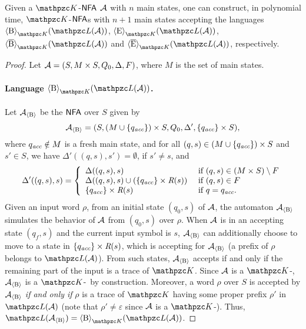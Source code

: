 \begin{proposition}\label{prop:closureUnderPrefixSuffix} Given a $\Ku$-$\text{\sffamily NFA}$ $\mathcal{A}$ with $n$ main states, 
one can construct, in polynomial time, $\Ku$-$\text{\sffamily NFA}$s with $n+1$ main states accepting the languages
$\hsB_{\Ku}(\Lang(\Au))$, $\hsE_{\Ku}(\Lang(\Au))$, $\hsBt_{\Ku}(\Lang(\Au))$ and $\hsEt_{\Ku}(\Lang(\Au))$, 
respectively.
\end{proposition}
\begin{proof}
Let $\mathcal{A}=(S, M\times S,Q_0,\Delta,F)$, where $M$ is the set of main states. 

\paragraph*{Language $\hsB_{\Ku}(\Lang(\Au))$.} Let $\mathcal{A}_{\operatorname{\langle B\rangle}}$ be the $\text{\sffamily NFA}$ over $S$ given by
\[\mathcal{A}_{\operatorname{\langle B\rangle}}=(S,(M\cup \{q_{\textit{acc}}\})\times S ,Q_0,\Delta',\{q_{\textit{acc}}\}\times S),\] where $q_{\textit{acc}}\notin M$ is a fresh main state, and for all $(q,s)\in (M\cup \{q_{\textit{acc}}\})\times S$ and $s'\in S$, we have $\Delta'((q,s),s')=\emptyset$, if $s'\neq s$, and 
%
\[
\Delta'((q,s),s) =  \left\{
    \begin{array}{ll}
    \Delta((q,s),s)
      &    \text{ if }   (q,s)\in (M\times S)\setminus F
      \\
    \Delta((q,s),s) \cup 
     (\{q_{\textit{acc}}\}\times \textit{R}(s))
      &    \text{ if }    (q,s)\in F
      \\
    \{q_{\textit{acc}}\}\times \textit{R}(s) &    \text{ if }    q = q_{\textit{acc}}.
    \end{array}
  \right.
\]
%
Given an input word $\rho$, from an initial state $(q_0,s)$ of $\mathcal{A}$,   the automaton $\mathcal{A}_{\operatorname{\langle B\rangle}}$ simulates the behavior of $\mathcal{A}$ from $(q_0,s)$ over $\rho$. When $\mathcal{A}$ is in an accepting state $(q_f,s)$ and the current  input symbol is $s$, $\mathcal{A}_{\operatorname{\langle B\rangle}}$ can additionally choose
to  move to a state in  $\{q_{\textit{acc}}\}\times \textit{R}(s)$, which is accepting for $\mathcal{A}_{\operatorname{\langle B\rangle}}$ (a prefix of $\rho$ belongs to  $\Lang(\Au)$). From such states, $\mathcal{A}_{\operatorname{\langle B\rangle}}$ accepts if and only if the remaining part of the input is a trace of $\Ku$.
Since $\mathcal{A}$ is a $\Ku$-\NFA, $\mathcal{A}_{\operatorname{\langle B\rangle}}$ is a $\Ku$-\NFA\  by construction. Moreover, a word $\rho$ over $S$ is accepted by $\mathcal{A}_{\operatorname{\langle B\rangle}}$  \emph{if and only if} $\rho$ is a trace of $\Ku$ having some proper prefix $\rho'$ in $\Lang(\Au)$ (note that $\rho'\neq \varepsilon$ since $\mathcal{A}$ is a $\Ku$-\NFA). Thus, $\Lang(\Au_{\hsB})=\hsB_{\Ku}(\Lang(\Au))$.%


\end{proof}
